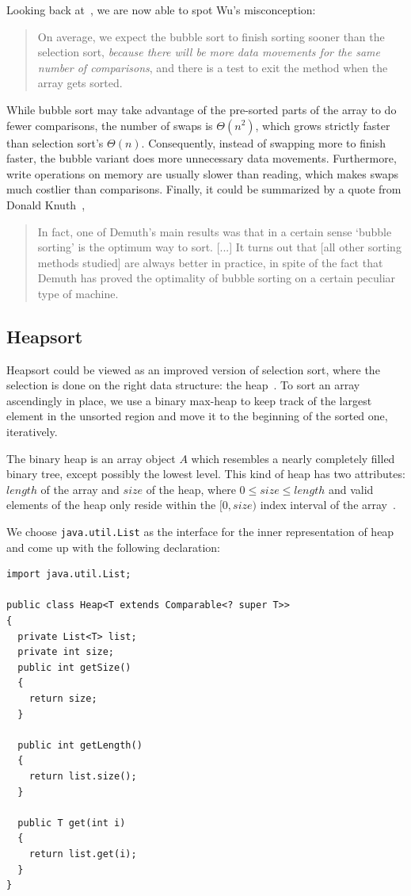 \documentclass[a4paper,12pt]{article}
\begin{document}
Looking back at~\cite[p. 646]{wu}, we are now able to spot Wu's misconception:
\begin{quote}
  On average, we expect the bubble sort to finish sorting sooner than
  the selection sort, \emph{because there will be more data movements for
  the same number of comparisons}, and there is a test to exit the method
  when the array gets sorted.
\end{quote}

While bubble sort may take advantage of the pre-sorted parts of the array
to do fewer comparisons, the number of swaps is $\Theta(n^2)$, which grows
strictly faster than selection sort's $\Theta(n)$.  Consequently, instead of
swapping more to finish faster, the bubble variant does more unnecessary
data movements.  Furthermore, write operations on memory are usually slower
than reading, which makes swaps much costlier than comparisons.  Finally,
it could be summarized by a quote from Donald Knuth~\cite{peculiar},
\begin{quote}
  In fact, one of Demuth's main results was that in a certain sense
  `bubble sorting' is the optimum way to sort.  [...]  It turns out that
  [all other sorting methods studied] are always better in practice,
  in spite of the fact that Demuth has proved the optimality of bubble sorting
  on a certain peculiar type of machine. 
\end{quote}

\subsection{Heapsort}
Heapsort could be viewed as an improved version of selection sort, where
the selection is done on the right data structure: the heap~\cite{heapselect}.
To sort an array ascendingly in place, we use a binary max-heap to keep track
of the largest element in the unsorted region and move it to the beginning
of the sorted one, iteratively.

The binary heap is an array object $A$ which resembles a nearly completely
filled binary tree, except possibly the lowest level.  This kind of heap has
two attributes: $length$ of the array and $size$ of the heap,
where $0 \le size \le length$ and valid elements of the heap only reside
within the $[0, size)$ index interval of the array~\cite[p. 151]{clrs}.

We choose \verb|java.util.List| as the interface for the inner representation
of heap and come up with the following declaration:
\begin{verbatim}
import java.util.List;

public class Heap<T extends Comparable<? super T>>
{
  private List<T> list;
  private int size;
  public int getSize()
  {
    return size;
  }

  public int getLength()
  {
    return list.size();
  }

  public T get(int i)
  {
    return list.get(i);
  }
}
\end{verbatim}
\end{document}
